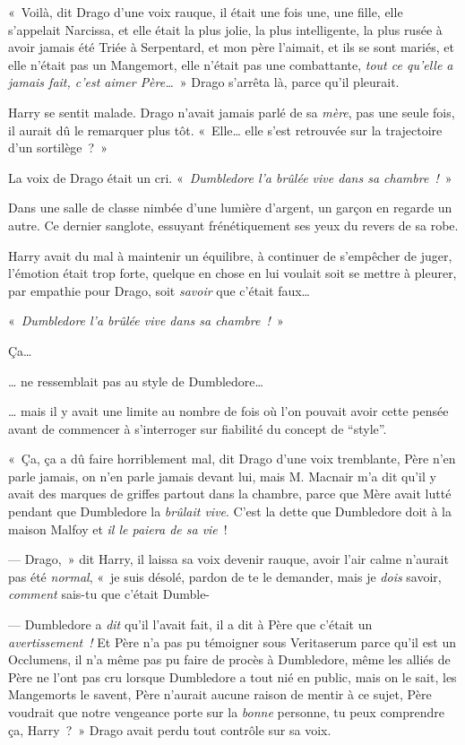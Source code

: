 «~Voilà, dit Drago d'une voix rauque, il était une fois une, une fille, elle s'appelait Narcissa, et elle était la plus jolie, la plus intelligente, la plus rusée à avoir jamais été Triée à Serpentard, et mon père l'aimait, et ils se sont mariés, et elle n'était pas un Mangemort, elle n'était pas une combattante, \emph{tout ce qu'elle a jamais fait, c'est aimer Père…}~» Drago s'arrêta là, parce qu'il pleurait.

Harry se sentit malade.
Drago n'avait jamais parlé de sa \emph{mère}, pas une seule fois, il aurait dû le remarquer plus tôt.
«~Elle… elle s'est retrouvée sur la trajectoire d'un sortilège~?~»

La voix de Drago était un cri.
«~\emph{Dumbledore l'a brûlée vive dans sa chambre~!}~»

\later

Dans une salle de classe nimbée d'une lumière d'argent, un garçon en regarde un autre.
Ce dernier sanglote, essuyant frénétiquement ses yeux du revers de sa robe.

Harry avait du mal à maintenir un équilibre, à continuer de s'empêcher de juger, l'émotion était trop forte, quelque en chose en lui voulait soit se mettre à pleurer, par empathie pour Drago, soit \emph{savoir} que c'était faux…

«~\emph{Dumbledore l'a brûlée vive dans sa chambre~!}~»

Ça…

… ne ressemblait pas au style de Dumbledore…

… mais il y avait une limite au nombre de fois où l'on pouvait avoir cette pensée avant de commencer à s'interroger sur fiabilité du concept de “style”.

«~Ça, ça a dû faire horriblement mal, dit Drago d'une voix tremblante, Père n'en parle jamais, on n'en parle jamais devant lui, mais M. Macnair m'a dit qu'il y avait des marques de griffes partout dans la chambre, parce que Mère avait lutté pendant que Dumbledore la \emph{brûlait vive}.
C'est la dette que Dumbledore doit à la maison Malfoy et \emph{il le paiera de sa vie}~!

--- Drago,~» dit Harry, il laissa sa voix devenir rauque, avoir l'air calme n'aurait pas été \emph{normal}, «~je suis désolé, pardon de te le demander, mais je \emph{dois} savoir, \emph{comment} sais-tu que c'était Dumble-

--- Dumbledore a \emph{dit} qu'il l'avait fait, il a dit à Père que c'était un \emph{avertissement~!} Et Père n'a pas pu témoigner sous Veritaserum parce qu'il est un Occlumens, il n'a même pas pu faire de procès à Dumbledore, même les alliés de Père ne l'ont pas cru lorsque Dumbledore a tout nié en public, mais on le sait, les Mangemorts le savent, Père n'aurait aucune raison de mentir à ce sujet, Père voudrait que notre vengeance porte sur la \emph{bonne} personne, tu peux comprendre ça, Harry~?~»
 Drago avait perdu tout contrôle sur sa voix.

